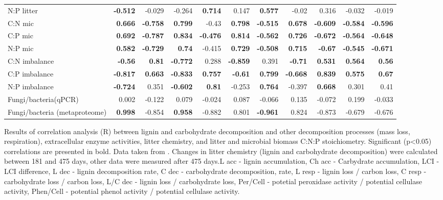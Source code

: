 \documentclass[10pt]{article}
\begin{document}
\begin{flushleft}
\begin{landscape}
\begin{table}[h!]
\begin{center}
{\begin{tabular}{lrrrrrrrrrr}
  N:P litter & \textbf{-0.512} & -0.029 & -0.264 & \textbf{0.714} & 0.147 & \textbf{0.577} & -0.02 & 0.316 & -0.032 & -0.019 \\ 
  C:N mic & \textbf{0.666} & \textbf{-0.758} & \textbf{0.799} & -0.43 & \textbf{0.798} & \textbf{-0.515} & \textbf{0.678} & \textbf{-0.609} & \textbf{-0.584} & \textbf{-0.596} \\ 
  C:P mic & \textbf{0.692} & \textbf{-0.787} & \textbf{0.834} & \textbf{-0.476} & \textbf{0.814} & \textbf{-0.562} & \textbf{0.726} & \textbf{-0.672} & \textbf{-0.564} & \textbf{-0.648} \\ 
  N:P mic & \textbf{0.582} & \textbf{-0.729} & \textbf{0.74} & -0.415 & \textbf{0.729} & \textbf{-0.508} & \textbf{0.715} & \textbf{-0.67} & \textbf{-0.545} & \textbf{-0.671} \\ 
  C:N imbalance & \textbf{-0.56} & \textbf{0.81} & \textbf{-0.772} & 0.288 & \textbf{-0.859} & 0.391 & \textbf{-0.71} & \textbf{0.531} & \textbf{0.564} & \textbf{0.56} \\ 
  C:P imbalance & \textbf{-0.817} & \textbf{0.663} & \textbf{-0.833} & \textbf{0.757} & \textbf{-0.61} & \textbf{0.799} & \textbf{-0.668} & \textbf{0.839} & \textbf{0.575} & \textbf{0.67} \\ 
  N:P imbalance & \textbf{-0.724} & 0.351 & \textbf{-0.602} & \textbf{0.81} & -0.253 & \textbf{0.764} & -0.397 & \textbf{0.668} & 0.301 & 0.41 \\ 
  Fungi/bacteria(qPCR) & 0.002 & -0.122 & 0.079 & -0.024 & 0.087 & -0.066 & 0.135 & -0.072 & 0.199 & -0.033 \\ 
  Fungi/bacteria (metaproteome) & \textbf{0.998} & -0.854 & \textbf{0.958} & -0.882 & 0.801 & \textbf{-0.961} & 0.824 & -0.873 & -0.679 & -0.676 \\ 
   \hline
\end{tabular}
}
\end{center}
\end{table}
\newpage
\begin{table}[h!]
\begin{center}
\caption{Results of correlation analysis (R) between lignin and carbohydrate decomposition and other decomposition processes (mass loss, respiration), extracellular enzyme activities, litter chemistry, and litter and microbial biomass C:N:P stoichiometry. Significant (p\textless 0.05) correlations are presented in bold. Data taken from \cite{Mooshammer2011, Leitner2011}. Changes in litter chemistry (lignin and carbohydrate decomposition) were calculated between 181 and 475 days, other data were measured after 475 days.L acc - lignin accumulation, Ch acc - Carbydrate accumulation, LCI - LCI difference, L dec - lignin decomposition rate, C dec - carbohydrate decomposition,  rate, L resp - lignin loss / carbon loss, C resp - carbohydrate loss / carbon loss, L/C dec - lignin loss / carbohydrate loss, Per/Cell - potetial peroxidase activity / potential cellulase activity, Phen/Cell - potential phenol activity / potential cellulase activity.}

\end{center}
\end{table}
\end{landscape}
\end{flushleft}
\end{document}
